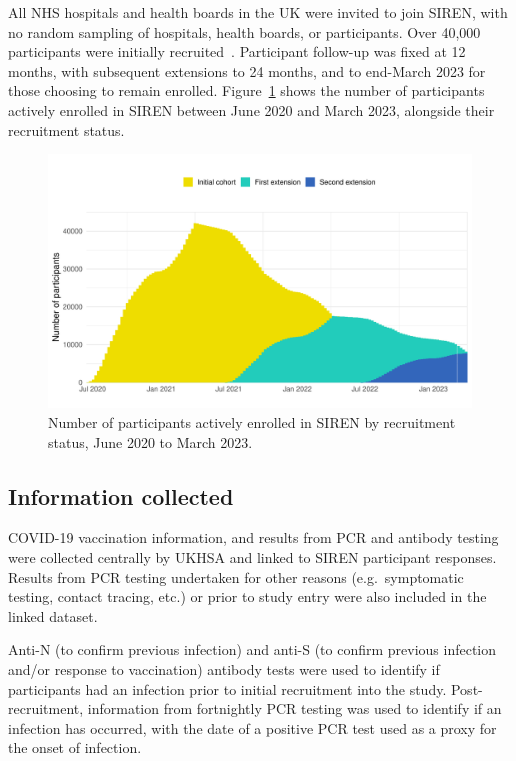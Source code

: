 All NHS hospitals and health boards in the UK were invited to join SIREN, with no random sampling of hospitals, health boards, or participants. Over 40,000 participants were initially recruited~\parencite{Wallace2022-vs}. Participant follow-up was fixed at 12 months, with subsequent extensions to 24 months, and to end-March 2023 for those choosing to remain enrolled. Figure~\ref{fig:sirenparticipants} shows the number of participants actively enrolled in SIREN between June 2020 and March 2023, alongside their recruitment status.

\begin{figure}[htbp!]
    \centering
    \includegraphics[width=\textwidth]{participants.pdf}
    \caption[Number of participants actively enrolled in SIREN by recruitment status, June 2020 to March 2023]{Number of participants actively enrolled in SIREN by recruitment status, June 2020 to March 2023.}\label{fig:sirenparticipants}
\end{figure}

\subsection{Information collected}

COVID-19 vaccination information, and results from PCR and antibody testing were collected centrally by UKHSA and linked to SIREN participant responses. Results from PCR testing undertaken for other reasons (e.g.\ symptomatic testing, contact tracing, etc.) or prior to study entry were also included in the linked dataset.

Anti-N (to confirm previous infection) and anti-S (to confirm previous infection and/or response to vaccination) antibody tests were used to identify if participants had an infection prior to initial recruitment into the study. Post-recruitment, information from fortnightly PCR testing was used to identify if an infection has occurred, with the date of a positive PCR test used as a proxy for the onset of infection.

